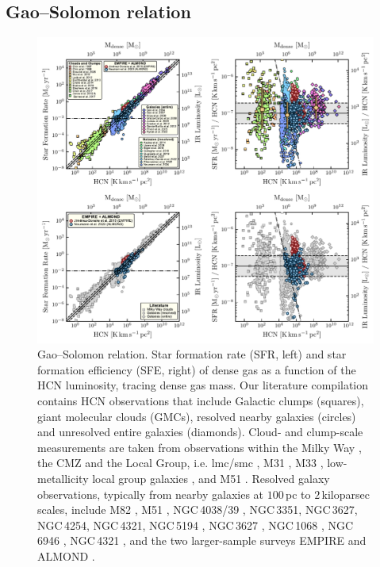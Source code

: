 \documentclass[letter, longauth]{aa} %
\begin{document}
\subsection{Gao--Solomon relation}

\begin{figure}
\centering
\includegraphics[width=\textwidth]{Figures/Gao_Solomon_relation_letter_compressed.pdf}
\caption{Gao--Solomon relation. Star formation rate (SFR, left) and star formation efficiency (SFE, right) of dense gas as a function of the HCN luminosity, tracing dense gas mass. Our literature compilation contains HCN observations that include Galactic clumps (squares), giant molecular clouds (GMCs), resolved nearby galaxies (circles) and unresolved entire galaxies (diamonds). 
Cloud- and clump-scale measurements are taken from observations within the Milky Way \citep{Wu2010, Lada2012, Evans2014, Stephens2016}, the CMZ \citep{Jones2012, Barnes2017} and the Local Group, i.e. \acrshort{lmc}/\acrshort{smc} \citep{Chin1997, Chin1998}, M31 \citep{Brouillet2005}, M33 \citep{Buchbender2013}, low-metallicity local group galaxies \citep{Braine2017}, and M51 \citep{Chen2017}.
Resolved galaxy observations, typically from nearby galaxies at $100\,$pc to $2\,$kiloparsec scales, include M82 \citep{Kepley2014}, M51 \citep{Usero2015, Querejeta2019}, NGC\,4038/39 \citep{Bigiel2015}, NGC\,3351, NGC\,3627, NGC\,4254, NGC\,4321, NGC\,5194 \citep{Gallagher2018a}, NGC\,3627 \citep{Beslic2021}, NGC\,1068 \citep{Sanchez-Garcia2022}, NGC\,6946 \citep{Eibensteiner2022}, NGC\,4321 \citep{Neumann2024}, and the two larger-sample surveys EMPIRE \citep[nine galaxies; ][]{Jimenez-Donaire2019} and ALMOND \citep[25 galaxies; ][]{Neumann2023a}.
}
\end{figure}
\end{document}
